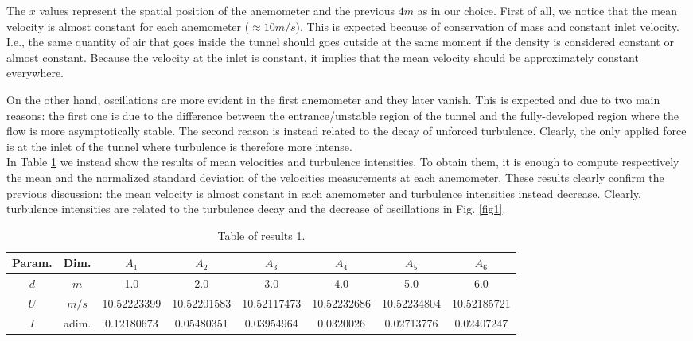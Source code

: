 \documentclass[11pt,titlepage]{article}
\begin{document}
The $x$ values represent the spatial position of the anemometer and the previous $4m$ as in our choice. First of all, we notice that the mean velocity is almost constant for each anemometer ($\approx 10m/s$). This is expected because of conservation of mass and constant inlet velocity. I.e., the same quantity of air that goes inside the tunnel should goes outside at the same moment if the density is considered constant or almost constant. Because the velocity at the inlet is constant, it implies that the mean velocity should be approximately constant everywhere.

On the other hand, oscillations are more evident in the first anemometer and they later vanish. This is expected and due to two main reasons: the first one is due to the difference between the entrance/unstable region of the tunnel and the fully-developed region where the flow is more asymptotically stable. The second reason is instead related to the decay of unforced turbulence. Clearly, the only applied force is at the inlet of the tunnel where turbulence is therefore more intense. \\

In Table \ref{table1} we instead show the results of mean velocities and turbulence intensities. To obtain them, it is enough to compute respectively the mean and the normalized standard deviation of the velocities measurements at each anemometer. These results clearly confirm the previous discussion: the mean velocity is almost constant in each anemometer and turbulence intensities instead decrease. Clearly, turbulence intensities are related to the turbulence decay and the decrease of oscillations in Fig. \ref{fig1}.

\begin{table} [h]
\centering
\caption{Table of results 1.} \label{table1}
    \begin{tabular}{ | c | c | c | c | c | c | c | c |}
        \hline
        Param. & Dim. & $A_1$ & $A_2$ & $A_3$ & $A_4$ & $A_5$ & $A_6$ \\
        \hline
        $d$ & $m$ & 1.0 & 2.0 & 3.0 & 4.0 & 5.0 & 6.0 \\
        \hline
        $U$ & $m/s$&10.52223399 &10.52201583&10.52117473 &10.52232686& 10.52234804& 10.52185721 \\
        \hline
        $I$ & adim.& 0.12180673& 0.05480351& 0.03954964 &0.0320026  &0.02713776& 0.02407247 \\
        \hline
    \end{tabular}
\end{table}
\end{document}
